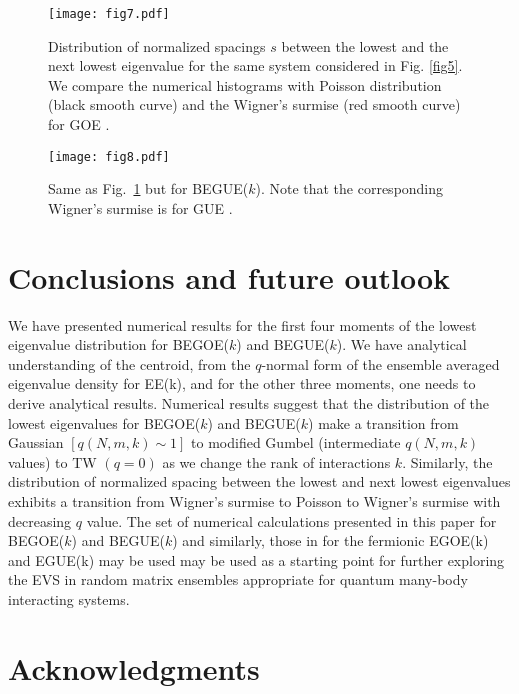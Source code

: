 \begin{figure}[tbh]
	\begin{center}
		\texttt{[image: fig7.pdf]}
	\end{center}
	\caption{Distribution of normalized spacings $s$ between the lowest and the next lowest eigenvalue for the same system considered in Fig. \ref{fig5}. We compare the numerical histograms with Poisson distribution (black smooth curve) and the Wigner's surmise (red smooth curve) for GOE \cite{Mehta}.}
		\label{fig7}
\end{figure}

\begin{figure}[tbh]
	\begin{center}
		\texttt{[image: fig8.pdf]}
	\end{center}
	\caption{Same as Fig.~\ref{fig7} but for BEGUE($k$). Note that the corresponding Wigner's surmise is for GUE \cite{Mehta}.}
	\label{fig8}
\end{figure}

\section{Conclusions and future outlook}
\label{sec4}

We have presented numerical results for the first four moments of the lowest eigenvalue distribution for BEGOE($k$) and BEGUE($k$). We have analytical understanding of the centroid, from the $q$-normal form of the ensemble averaged eigenvalue density for EE(k),  and for the other three moments, one needs to derive analytical results. Numerical results suggest that the distribution of the lowest eigenvalues for BEGOE($k$) and BEGUE($k$) make a transition from Gaussian $[q(N,m,k) \sim 1]$ to modified Gumbel (intermediate $q(N,m,k)$ values) to TW $(q = 0)$ as we change the rank of interactions $k$. Similarly, the distribution of normalized spacing between the lowest and next lowest eigenvalues exhibits a transition from Wigner's surmise to Poisson to Wigner's surmise with decreasing $q$ value. The set of numerical calculations presented in this paper for BEGOE($k$) and BEGUE($k$) and similarly,  those in \cite{Be-23} for the fermionic EGOE(k) and EGUE(k) may be used may be used as a starting point for further exploring the EVS in random matrix ensembles appropriate for quantum many-body interacting systems.  

\section*{Acknowledgments}

